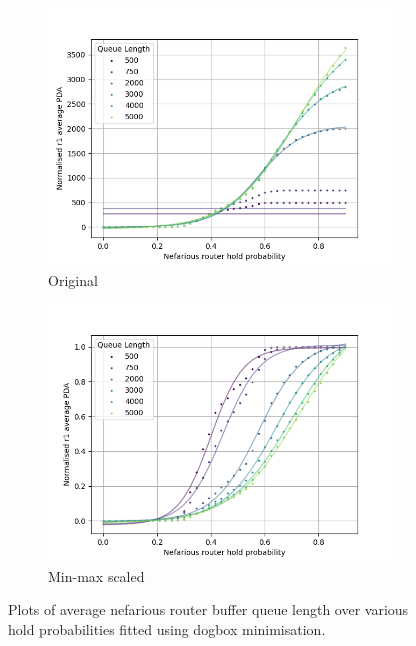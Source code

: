 \begin{figure}[H]
    \centering
    \begin{subfigure}{0.475\textwidth}
        \includegraphics[width=\textwidth]{figs/results/qlen_fitting/qlen_PDA_dogbox.png}
        \caption{Original}
    \end{subfigure}
    \begin{subfigure}{0.475\textwidth}
        \includegraphics[width=\textwidth]{figs/results/qlen_fitting/norm_qlen_PDA_dogbox.png}
        \caption{Min-max scaled}
    \end{subfigure}
    \caption{Plots of average nefarious router buffer queue length over various hold probabilities fitted using dogbox minimisation.}
\end{figure}

